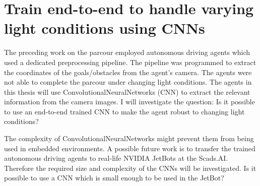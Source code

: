 \section*{Train end-to-end to handle varying light conditions using CNNs}

The preceding work on the parcour employed autonomous driving agents which used a dedicated preprocessing pipeline. The pipeline was programmed to extract the coordinates of the goals/obstacles from the agent's camera. The agents were not able to complete the parcour under changing light conditions. The agents in this thesis will use ConvolutionalNeuralNetworks (CNN) to extract the relevant information from the camera images. I will investigate the question: Is it possible to use an end-to-end trained CNN to make the agent robust to changing light conditions?

The complexity of ConvolutionalNeuralNetworks might prevent them from being used in embedded environments. A possible future work is to transfer the trained autonomous driving agents to real-life NVIDIA JetBots at the Scads.AI. Therefore the required size and complexity of the CNNs will be investigated. Is it possible to use a CNN which is small enough to be used in the JetBot?






